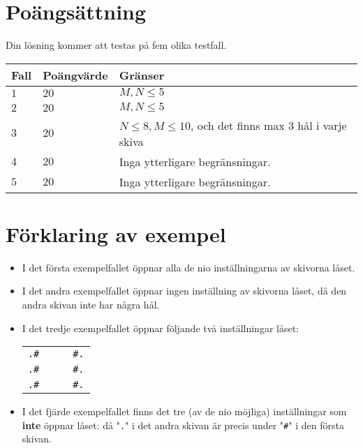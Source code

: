 \section*{Poängsättning}
Din lösning kommer att testas på fem olika testfall.

\noindent
\begin{tabular}{| l | l | l |}
  \hline
  Fall & Poängvärde & Gränser \\ \hline
  $1$    & $20$        &  $M, N \le 5$ \\ \hline 
  $2$    & $20$        &  $M, N \le 5$ \\ \hline 
  $3$    & $20$        &  $N \le 8, M \le 10$, och det finns max 3 hål i varje skiva \\ \hline 
  $4$    & $20$        &  Inga ytterligare begränsningar. \\ \hline
  $5$    & $20$        &  Inga ytterligare begränsningar. \\ \hline
\end{tabular}

\section*{Förklaring av exempel}

\begin{itemize}
  \item
I det första exempelfallet öppnar alla de nio inställningarna av skivorna låset.

  \item
I det andra exempelfallet öppnar ingen inställning av skivorna låset, då den andra skivan inte har några hål.

  \item
I det tredje exempelfallet öppnar följande två inställningar låset:
\begin{center}
  \begin{tabular}{ll|ll}
    \texttt{.\#}&&& \texttt{\#.}\\
    \texttt{.\#}&&& \texttt{\#.}\\
    \texttt{.\#}&&& \texttt{\#.}
  \end{tabular}
\end{center}

  \item
    I det fjärde exempelfallet finns det tre (av de nio möjliga) inställningar som \textbf{inte} öppnar låset: då "\texttt{.}" i det andra skivan är precis under
    "\texttt{\#}" i den första skivan.

\end{itemize}
